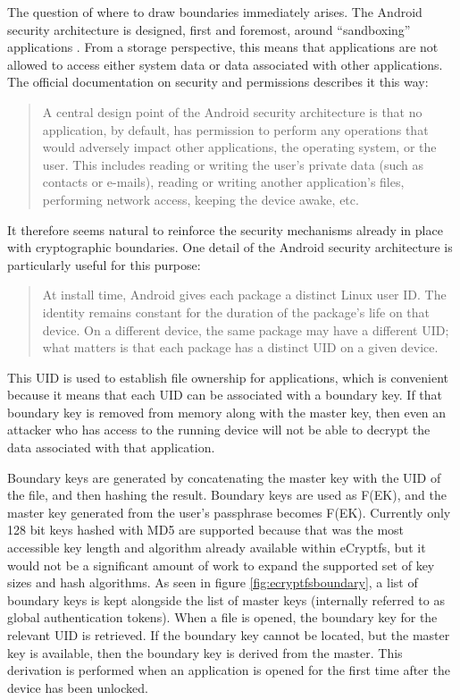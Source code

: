 The question of where to draw boundaries immediately arises. The Android security architecture is designed, first and foremost,
around ``sandboxing'' applications . From a storage perspective, this means that applications are not allowed to access either
system data or data associated with other applications. The official documentation on security and permissions describes it this way: 
\begin{quote} 
A central design point of the Android security architecture is that no application, by default, has permission to perform any
operations that would adversely impact other applications, the operating system, or the user.  This includes reading or writing the
user's private data (such as contacts or e-mails), reading or writing another application's files, performing network access,
keeping the device awake, etc. \cite{securitydoc} 
\end{quote} 
It therefore seems natural to reinforce the security
mechanisms already in place with cryptographic boundaries.  One detail of the Android security architecture is particularly useful
for this purpose: 
\begin{quote} 
At install time, Android gives each package a distinct Linux user ID. The identity remains constant
for the duration of the package's life on that device. On a different device, the same package may have a different UID; what
matters is that each package has a distinct UID on a given device. \cite{securitydoc}
\end{quote} 
This UID is used to establish file ownership for applications, which is convenient because it means that each UID can be associated
with a boundary key.  If that boundary key is removed from memory along with the master key, then even an attacker who has access to
the running device will not be able to decrypt the data associated with that application.

Boundary keys are generated by concatenating the master key with the UID of the file, and then hashing the result.  Boundary keys
are used as F(EK), and the master key generated from the user's passphrase becomes F(EK). Currently
only 128 bit keys hashed with MD5 are supported because that was the most accessible key length and algorithm already available
within eCryptfs, but it would not be a significant amount of work to expand the supported set of key sizes and hash algorithms. As
seen in figure \ref{fig:ecryptfsboundary}, a list of boundary keys is kept alongside the list of master keys (internally referred
to as global authentication tokens).  When a file is opened, the boundary key for the relevant UID is retrieved. If the boundary key
cannot be located, but the master key is available, then the boundary key is derived from the master. This derivation is performed
when an application is opened for the first time after the device has been unlocked.

